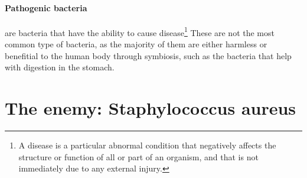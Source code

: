 \paragraph{Pathogenic bacteria} are bacteria that have the ability to cause disease\footnote{A disease is a particular abnormal condition that negatively affects the structure or function of all or part of an organism, and that is not immediately due to any external injury\cite{DorlandsMedicalDictionary2010}.} These are not the most common type of bacteria, as the majority of them are either harmless or benefitial to the human body through symbiosis, such as the bacteria that help with digestion in the stomach\cite{murrayMicrobiologiaMedica2013}.
\section{The enemy: Staphylococcus aureus}
